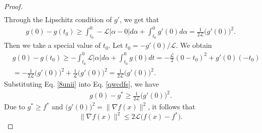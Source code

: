 \documentclass{article} %
\begin{document}
\begin{proof}
{\begin{equation}
\begin{aligned}
	\end{aligned}
	\end{equation}Through the Lipschitz condition of $g'$, we get that
	\begin{equation}\nonumber
	\begin{aligned}
	g(0)-g(t_{0})\geq\int_{t_{0}}^{0}-\mathcal{L}|\alpha-0|d\alpha+\int_{t_{0}}^{0}g'(0)d\alpha=\frac{1}{2\mathcal{L}}\big(g'(0)\big)^{2}.
	\end{aligned}
	\end{equation}
{	Then we take a special value of $t_{0}$. Let $t_{0}=-g'(0)/\mathcal{L}$. We obtain}
	\begin{equation}\label{8unii}
	\begin{aligned}
	&g(0)-g(t_{0})\geq-\int_{t_{0}}^{0}\mathcal{L}|\alpha|d\alpha+\int_{t_{0}}^{0}g(0)dt=-\frac{\mathcal{L}}{2}(0-t_{0})^{2}+g'(0)(-t_{0})\\&=-\frac{1}{2\mathcal{L}}\big(g'(0)\big)^{2}+\frac{1}{\mathcal{L}}\big(g'(0)\big)^{2}=\frac{1}{2\mathcal{L}}\big(g'(0)\big)^{2}.
	\end{aligned}
	\end{equation}Substituting Eq. \eqref{8unii} into Eq. \eqref{qwcdfs}, we have   
	\begin{equation}\nonumber
	\begin{aligned}
	g(0)-g^{*}\geq\frac{1}{2\mathcal{L}}\big(g'(0)\big)^{2}.
	\end{aligned}
	\end{equation}Due to $g^{*}\geq f^{*}$ and $\big(g'(0)\big)^{2}=\|\nabla f(x)\|^{2}$, it follows that
	\[
	\big\|\nabla f(x)\big\|^{2}\le 2\mathcal{L}\big(f(x)-f^{*}\big). \tag*{\qedhere}
	\]
}
\end{proof}
\end{document}
